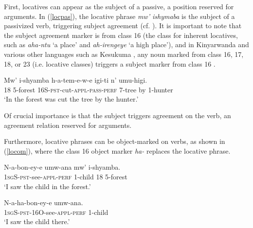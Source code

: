 \documentclass[output=paper]{langsci/langscibook}
\begin{document}
 
First, locatives can appear as the subject of a passive, a position reserved for arguments. In (\ref{locpas}), the locative phrase \emph{mw' ishymaba} is the subject of a passivized verb, triggering subject agreement (cf. \citealt{BresnanKanerva1989,bresnan:1994}). It is important to note that the subject agreement marker is from class 16 (the class for inherent locatives, such as \emph{aha-ntu} `a place' and \emph{ah-irengeye} `a high place'), and in Kinyarwanda and various other languages such as Kesukuma {\citealt[245]{batibo:1985}}, any noun marked from class 16, 17, 18, or 23 (i.e. locative classes) triggers a subject marker from class 16  \citep{maho:1999}.


\begin{exe}

	\ex\label{locpas}\gll Mw' i-shyamba h-a-tem-e-w-e igi-ti n' umu-higi.\\
			{\scshape 18} 5-forest 16S-{\scshape pst}-cut-{\scshape appl-pass-perf} 7-tree by 1-hunter\\
			\glt `In the forest was cut the tree by the hunter.'

\end{exe}
%
 Of crucial importance is that the subject triggers agreement on the verb, an agreement relation reserved for arguments.  



Furthermore, locative phrases can be object-marked on verbs, as shown in (\ref{locom}), where the class 16 object marker \emph{ha-} replaces the locative phrase. 

\begin{exe}
	\ex\begin{xlist}
	\ex\label{loco}\gll N-a-bon-ey-e umw-ana mw' i-shyamba.\\
					1{\scshape sg}S-{\scshape pst}-see-{\scshape appl-perf} 1-child 18 5-forest\\
					\glt `I saw the child in the forest.'
					
	\ex\label{locom}\gll N-a-ha-bon-ey-e umw-ana.\\
			1{\scshape sg}S-{\scshape pst-16O}-see-{\scshape appl-perf} 1-child\\
			\glt `I saw the child there.'
	\end{xlist}
\end{exe}

 
 
\end{document}
